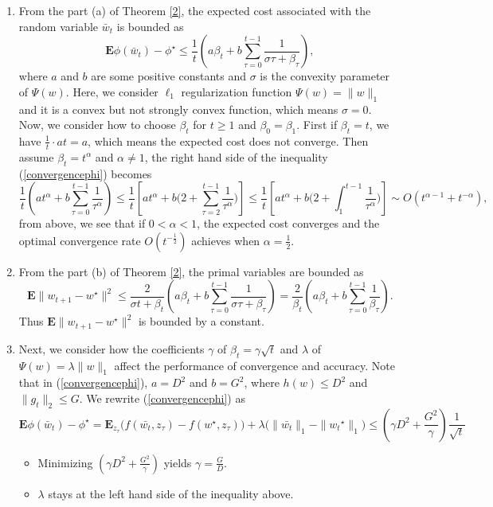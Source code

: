 \begin{enumerate}
	\item 
	From the part (a) of Theorem \ref{2}, the expected cost associated with the random variable $\bar{w}_t$ is bounded as
	\begin{equation}\label{convergencephi}
		\mathbf{E}\phi(\bar{w}_t)-\phi^{\star}
		\leq \frac{1}{t} \left(a \beta_t +b\sum\limits_{\tau=0}^{t-1}\frac{1}{\sigma\tau+\beta_\tau}\right),
	\end{equation}
	where $a$ and $b$ are some positive constants and $\sigma$ is the convexity parameter of $\Psi(w)$. Here, we consider $\ell_1$ regularization function $\Psi(w)=\|w\|_1$ and it is a convex but not strongly convex function, which means $\sigma=0$.\\
	Now, we consider how to choose $\beta_t$ for $t\geq 1$ and $\beta_0 = \beta_1$. First if $\beta_t = t$, we have $\frac{1}{t}\cdot a t = a$, which means the expected cost does not converge. Then assume $\beta_t=t^{\alpha}$ and $\alpha\neq 1$, the right hand side of the inequality (\ref{convergencephi}) becomes 
	$$
	\frac{1}{t} \left(a t^{\alpha} +b\sum\limits_{\tau=0}^{t-1}\frac{1}{\tau^{\alpha}}\right) \leq 
	\frac{1}{t} \left[ a t^{\alpha} +b \big( 2+ \sum\limits_{\tau=2}^{t-1}\frac{1}{\tau^{\alpha}} \big) \right] \leq
	\frac{1}{t} \left[ a t^{\alpha} +b \big( 2+ \int_{1}^{t-1} \frac{1}{\tau^{\alpha}} \big) \right] 		    \sim
	O(t^{\alpha-1} + t^{-\alpha}),
	$$
	from above, we see that if $0<\alpha<1$, the expected cost converges and the optimal convergence rate $O(t^{-\frac{1}{2}})$ achieves when $\alpha=\frac{1}{2}$.
	\item 
	From the part (b) of Theorem \ref{2}, the primal variables are bounded as 
	$$
	\mathbf{E}\|w_{t+1}-w^{\star}\|^2\leq \frac{2}{\sigma t+\beta_t}\left(a \beta_t +b\sum\limits_{\tau=0}^{t-1}\frac{1}{\sigma\tau+\beta_\tau}\right)
	= \frac{2}{\beta_t}\left(a \beta_t +b\sum\limits_{\tau=0}^{t-1}\frac{1}{\beta_\tau}\right).
	$$
	Thus $\mathbf{E}\|w_{t+1}-w^{\star}\|^2$ is bounded by a constant.
	\item 
	Next, we consider how the coefficients $\gamma$ of $\beta_t = \gamma \sqrt{t}$ and $\lambda$ of $\Psi(w)=\lambda \| w \|_1$ affect the performance of convergence and accuracy. Note that in (\ref{convergencephi}), $a=D^2$ and $b=G^2$, where $h(w)\leq D^2$ and $\|g_t\|_2 \leq G$. We rewrite (\ref{convergencephi}) as
	$$
	\mathbf{E}\phi(\bar{w}_t)-\phi^{\star} = 
	\mathbf{E}_{z_\tau}\big(f(\bar{w_t},z_{\tau})-f(w^{\star},z_{\tau})\big)+\lambda\big(\|\bar{w_t}\|_1-\|{w_t}^{\star}\|_1\big)
	\leq
	(\gamma D^2 +\frac{G^2}{\gamma})\frac{1}{\sqrt{t}}
	$$
	\begin{itemize}
		\item 
		Minimizing $\left(\gamma D^2 +\frac{G^2}{\gamma}\right)$ yields $\gamma = \frac{G}{D}$.
		\item 
		$\lambda$ stays at the left hand side of the inequality above.
	\end{itemize}
\end{enumerate}


